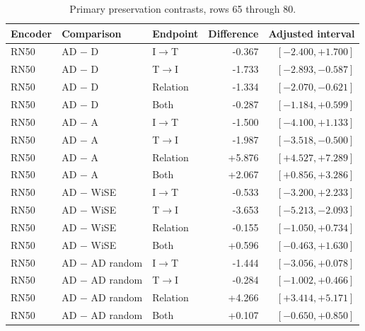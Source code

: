\begin{table}[t]
\centering
\small
\setlength{\tabcolsep}{3pt}
\begin{tabular}{lllrr}
\toprule
Encoder & Comparison & Endpoint & Difference & Adjusted interval\\
\midrule
RN50 & AD $-$ D & I$\to$T & -0.367 & $[-2.400,+1.700]$ \\
RN50 & AD $-$ D & T$\to$I & -1.733 & $[-2.893,-0.587]$ \\
RN50 & AD $-$ D & Relation & -1.334 & $[-2.070,-0.621]$ \\
RN50 & AD $-$ D & Both & -0.287 & $[-1.184,+0.599]$ \\
RN50 & AD $-$ A & I$\to$T & -1.500 & $[-4.100,+1.133]$ \\
RN50 & AD $-$ A & T$\to$I & -1.987 & $[-3.518,-0.500]$ \\
RN50 & AD $-$ A & Relation & +5.876 & $[+4.527,+7.289]$ \\
RN50 & AD $-$ A & Both & +2.067 & $[+0.856,+3.286]$ \\
RN50 & AD $-$ WiSE & I$\to$T & -0.533 & $[-3.200,+2.233]$ \\
RN50 & AD $-$ WiSE & T$\to$I & -3.653 & $[-5.213,-2.093]$ \\
RN50 & AD $-$ WiSE & Relation & -0.155 & $[-1.050,+0.734]$ \\
RN50 & AD $-$ WiSE & Both & +0.596 & $[-0.463,+1.630]$ \\
RN50 & AD $-$ AD random & I$\to$T & -1.444 & $[-3.056,+0.078]$ \\
RN50 & AD $-$ AD random & T$\to$I & -0.284 & $[-1.002,+0.466]$ \\
RN50 & AD $-$ AD random & Relation & +4.266 & $[+3.414,+5.171]$ \\
RN50 & AD $-$ AD random & Both & +0.107 & $[-0.650,+0.850]$ \\
\bottomrule
\end{tabular}
\caption{Primary preservation contrasts, rows 65 through 80.}\label{tab:adprimary64}
\end{table}



